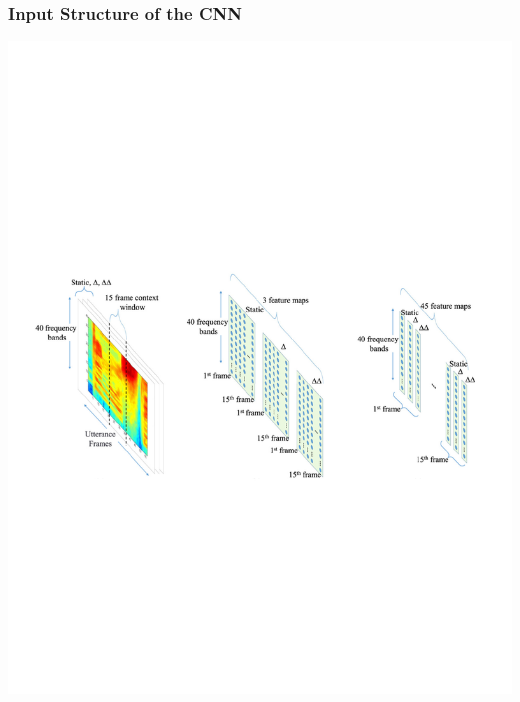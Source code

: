 \documentclass[notes]{beamer}
\begin{document}
\begin{frame}
	\frametitle{Input Structure of the CNN}
	\includegraphics[scale=0.6, trim=1.1cm 0 0 7.5cm, clip=true]{cnn-input.pdf}

\end{frame}
\end{document}

